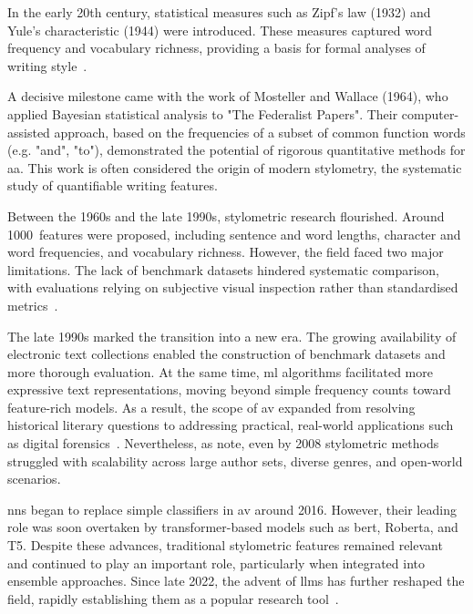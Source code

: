 
In the early 20th century, statistical measures such as Zipf's law (1932) and Yule's characteristic (1944) were introduced. 
These measures captured word frequency and vocabulary richness, providing a basis for formal analyses of writing style~\citep{neal_surveying_2018,stamatatos_survey_2009}.

A decisive milestone came with the work of Mosteller and Wallace (1964), who applied Bayesian statistical analysis to "The Federalist Papers".
Their computer-assisted approach, based on the frequencies of a subset of common function words (e.g. "and", "to"), demonstrated the potential of rigorous quantitative methods for \ac{aa}. 
This work is often considered the origin of modern stylometry, the systematic study of quantifiable writing features.

Between the 1960s and the late 1990s, stylometric research flourished.
Around \num{1000}~features were proposed, including sentence and word lengths, character and word frequencies, and vocabulary richness. 
However, the field faced two major limitations. 
The lack of benchmark datasets hindered systematic comparison, with evaluations relying on subjective visual inspection rather than standardised metrics~\citep{stamatatos_survey_2009}.

The late 1990s marked the transition into a new era. 
The growing availability of electronic text collections enabled the construction of benchmark datasets and more thorough evaluation. 
At the same time, \ac{ml} algorithms facilitated more expressive text representations, moving beyond simple frequency counts toward feature-rich models. 
As a result, the scope of \ac{av} expanded from resolving historical literary questions to addressing practical, real-world applications such as digital forensics~\citep{stamatatos_survey_2009}. 
Nevertheless, as \citet{abbasi_writeprints_2008} note, even by 2008 stylometric methods struggled with scalability across large author sets, diverse genres, and open-world scenarios.

\acp{nn} began to replace simple classifiers in \ac{av} around 2016. 
However, their leading role was soon overtaken by transformer-based models such as \acs{bert}, Ro\acs{bert}a, and T5. 
Despite these advances, traditional stylometric features remained relevant and continued to play an important role, particularly when integrated into ensemble approaches. 
Since late 2022, the advent of \acp{llm} has further reshaped the field, rapidly establishing them as a popular research tool~\citep{schmidt_llm_av_latin_24}.
